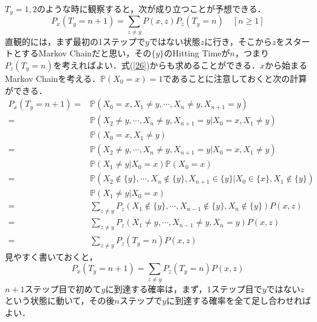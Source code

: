 \documentclass[12pt, a4paper]{jsarticle}
\theoremstyle{definition}
\begin{document}
$T_y = 1,2$のような時に観察すると，次が成り立つことが予想できる．
\begin{equation}
	P_x(T_y = n+1) =  \sum_{z \neq y}P(x,z)P_z(T_y = n) \quad [n \geq 1]　
\end{equation}
直観的には，まず最初の1ステップで$y$ではない状態$z$に行き，そこから$z$をスタートとするMarkov Chainだと思い，その$\{y\}$のHitting Timeが$n$，つまり$P_z(T_y = n)$を考えればよい．式(\ref{26})からも求めることができる．$x$から始まるMarkov Chainを考える．$\mathbb{P}(X_0 = x) = 1$であることに注意しておくと次の計算ができる．
\begin{align*}
P_x(T_y = n+1) =& \mathbb{P}(X_0 = x ,X_1 \neq y, \cdots, X_n \neq y, X_{n+1} = y) \\
=& \mathbb{P}(X_2 \neq y,\cdots,X_n\neq y, X_{n+1} = y | X_0 = x, X_1 \neq y)\\
& \mathbb{P}(X_0 = x,X_1 \neq y) \\
=& \mathbb{P}(X_2 \neq y,\cdots,X_n\neq y, X_{n+1} = y | X_0 = x, X_1 \neq y)\\
& \mathbb{P}(X_1 \neq y | X_0 = x)\mathbb{P}(X_0 = x) \\
=& \mathbb{P}(X_2 \notin \{y\},\cdots,X_n \notin \{y\}, X_{n+1} \in \{y\} | X_0 \in \{x\}, X_1 \notin \{y\})  \\
& \mathbb{P}(X_1 \neq y | X_0 = x) \\
=& \sum_{z \neq y}P_z(X_1\notin \{y\} , \cdots , X_{n-1} \notin \{y\}, X_n \notin \{y\}) P(x,z) \\
=& \sum_{z \neq y}P_z(X_1\neq y , \cdots , X_{n-1} \neq y, X_n = y) P(x,z) \\
=& \sum_{z \neq y}P_z(T_y = n) P(x,z)
\end{align*}
見やすく書いておくと，
\begin{equation}
P_x(T_y = n+1) = \sum_{z \neq y}P_z(T_y = n) P(x,z)
\end{equation}
$n+1$ステップ目で初めて$y$に到達する確率は，まず，$1$ステップ目で$y$ではない$z$という状態に動いて，その後$n$ステップで$y$に到達する確率を全て足し合わせればよい．
\end{document}
